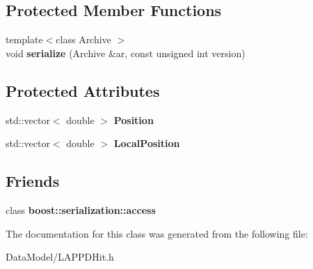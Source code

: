 \subsection*{Protected Member Functions}
\begin{DoxyCompactItemize}
\item 
\hypertarget{classLAPPDHit_a3039a8854f0295a7e517c159277bfa3f}{
{\footnotesize template$<$class Archive $>$ }\\void {\bfseries serialize} (Archive \&ar, const unsigned int version)}
\label{classLAPPDHit_a3039a8854f0295a7e517c159277bfa3f}

\end{DoxyCompactItemize}
\subsection*{Protected Attributes}
\begin{DoxyCompactItemize}
\item 
\hypertarget{classLAPPDHit_a979fc1e4b88cb77cac43c4dc3582ce3d}{
std::vector$<$ double $>$ {\bfseries Position}}
\label{classLAPPDHit_a979fc1e4b88cb77cac43c4dc3582ce3d}

\item 
\hypertarget{classLAPPDHit_a5517affe4e65ca692ce67160cd361d85}{
std::vector$<$ double $>$ {\bfseries LocalPosition}}
\label{classLAPPDHit_a5517affe4e65ca692ce67160cd361d85}

\end{DoxyCompactItemize}
\subsection*{Friends}
\begin{DoxyCompactItemize}
\item 
\hypertarget{classLAPPDHit_ac98d07dd8f7b70e16ccb9a01abf56b9c}{
class {\bfseries boost::serialization::access}}
\label{classLAPPDHit_ac98d07dd8f7b70e16ccb9a01abf56b9c}

\end{DoxyCompactItemize}


The documentation for this class was generated from the following file:\begin{DoxyCompactItemize}
\item 
DataModel/LAPPDHit.h\end{DoxyCompactItemize}
